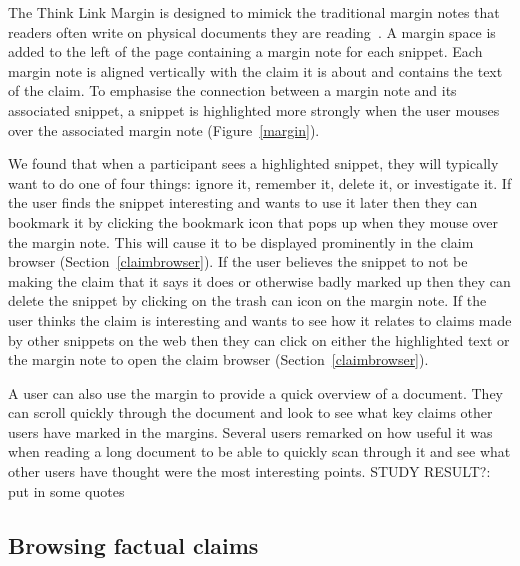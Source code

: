 \documentclass{chi2009}
\newcommand{\todo}[1]{}
\newcommand{\studyresult}[1]{{\color{red} STUDY RESULT?: #1}\\}
\begin{document}
The Think Link Margin is designed to mimick the traditional margin notes that readers often write on physical documents they are reading~\cite{marginalia}. A margin space is added to the left of the page containing a margin note for each snippet. Each margin note is aligned vertically with the claim it is about and contains the text of the claim. To emphasise the connection between a margin note and its associated snippet, a snippet is highlighted more strongly when the user mouses over the associated margin note (Figure~\ref{margin}). 

We found that when a participant sees a highlighted snippet, they will typically want to do one of four things: ignore it, remember it, delete it, or investigate it. If the user finds the snippet interesting and wants to use it later then they can bookmark it by clicking the bookmark icon that pops up when they mouse over the margin note. This will cause it to be displayed prominently in the claim browser (Section~\ref{claimbrowser}). If the user believes the snippet to not be making the claim that it says it does or otherwise badly marked up then they can delete the snippet by clicking on the trash can icon on the margin note. If the user thinks the claim is interesting and wants to see how it relates to claims made by other snippets on the web then they can click on either the highlighted text or the margin note to open the claim browser (Section~\ref{claimbrowser}).

A user can also use the margin to provide a quick overview of a document. They can scroll quickly through the document and look to see what key claims other users have marked in the margins. Several users remarked on how useful it was when reading a long document to be able to quickly scan through it and see what other users have thought were the most interesting points. \studyresult{put in some quotes}

\todo{sort out more consistent colors and icons between this view and the web view}
\todo{give the margin consistent colors with the highlight sections}
\todo{more nice zoomed-in screenshots showing the different interaction techniques}

\subsection{Browsing factual claims}
\label{browseclaim}\label{claimbrowser}
\end{document}
